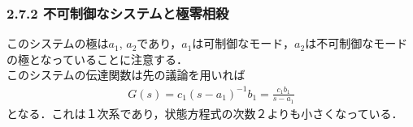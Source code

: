 \begin{frame}[t]
\frametitle{2.7.2 不可制御なシステムと極零相殺}
このシステムの極は$a_1$, $a_2$であり，$a_1$は可制御なモード，$a_2$は不可制御なモードの極となっていることに注意する．
\\[3mm]

このシステムの伝達関数は先の議論を用いれば
\begin{align}
	G(s) = c_1 (s - a_1) ^{-1} b_1 = \frac{c_1 b_1}{s - a_1}
\end{align}
となる．これは１次系であり，状態方程式の次数２よりも小さくなっている．

\end{frame}

